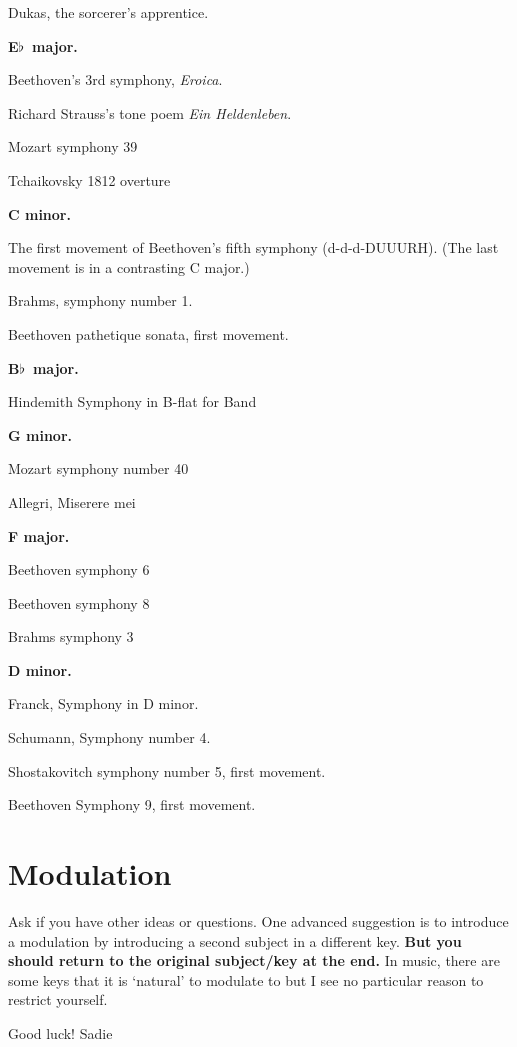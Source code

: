 \documentclass[a4paper]{article}
\newcommand\fl{$\flat$}
\begin{document}
Dukas, the sorcerer's apprentice.

\noindent\textbf{E\fl\ major.}

Beethoven's 3rd symphony, \textit{Eroica}.

Richard Strauss's tone poem \textit{Ein Heldenleben}.

Mozart symphony 39

Tchaikovsky 1812 overture

\noindent\textbf{C minor.}

The first movement of Beethoven's fifth symphony (d-d-d-DUUURH).
(The last movement is in a contrasting C major.)

Brahms, symphony number 1.

Beethoven pathetique sonata, first movement.

\noindent\textbf{B\fl\ major.}

Hindemith Symphony in B-flat for Band 

\noindent\textbf{G minor.}

Mozart symphony number 40

Allegri, Miserere mei

\noindent\textbf{F major.}

Beethoven symphony 6

Beethoven symphony 8

Brahms symphony 3

\noindent\textbf{D minor.}

Franck, Symphony in D minor.

Schumann, Symphony number 4.

Shostakovitch symphony number 5, first movement.

Beethoven Symphony 9, first movement.

\section{Modulation}

Ask if you have other ideas or questions. One advanced suggestion
is to introduce a modulation by introducing a second
subject in a different key. \textbf{But you should return to the
  original subject/key at the end.}  In music, there are some keys that
it is `natural' to modulate to
but I see no particular reason to restrict yourself.

Good luck! \hfill Sadie 
\end{document}
